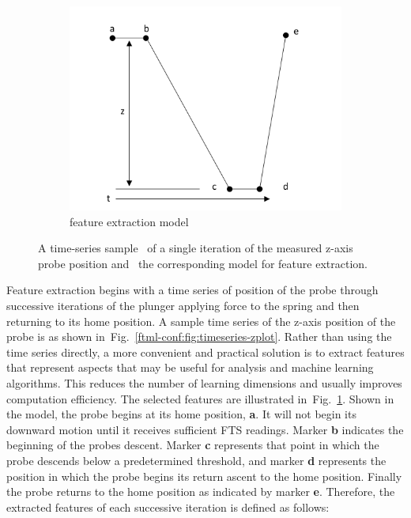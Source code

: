 \begin{figure}[!ht]
	\begin{subfigure}{.95\textwidth}
		\centering
		\includegraphics[]{./chapter-ftml/diagrams/timeseries.png}  
		\caption{feature extraction model}
		\label{ftml-conf:fig:timeseriesfeatures}
	\end{subfigure}
	
	\caption{A time-series sample~\protect{} of a single iteration of the measured z-axis probe position and~\protect{} the corresponding model for feature extraction.}
	\label{ftml-conf:fig:timeseries-and-model}
	
\end{figure}

Feature extraction begins with a time series of position of the probe through successive iterations of the plunger applying force to the spring and then returning to its home position.  A sample time series of the z-axis position of the probe is as shown in~Fig.~\ref{ftml-conf:fig:timeseries-zplot}.  Rather than using the time series directly, a more convenient and practical solution is to extract features that represent aspects that may be useful for analysis and machine learning algorithms.  This reduces the number of learning dimensions and usually improves computation efficiency.  The selected features are illustrated in~Fig.~\ref{ftml-conf:fig:timeseriesfeatures}.   Shown in the model, the probe begins at its home position, \textbf{a}.  It will not begin its downward motion until it receives sufficient FTS readings.  Marker \textbf{b} indicates the beginning of the probes descent.  Marker \textbf{c} represents that point in which the probe descends below a predetermined threshold, and marker \textbf{d} represents the position in which the probe begins its return ascent to the home position.  Finally the probe returns to the home position as indicated by marker \textbf{e}.  Therefore, the extracted features of each successive iteration is defined as follows:

